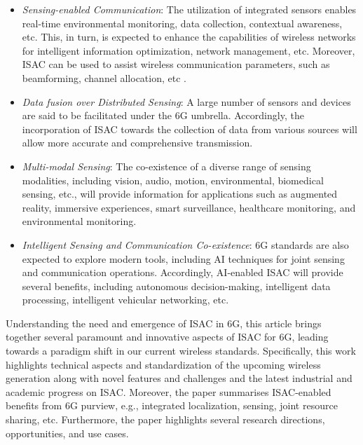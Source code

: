 \documentclass[journal, comsoc]{IEEEtran}
\begin{document}
\begin{itemize}

\item  \emph{Sensing-enabled Communication}: The utilization of integrated sensors enables real-time environmental monitoring, data collection, contextual awareness, etc. This, in turn, is expected to enhance the capabilities of wireless networks for intelligent information optimization, network management, etc. Moreover, ISAC can be used to assist wireless communication parameters, such as beamforming, channel allocation, etc \cite{l1}. 
\item  	\emph{Data fusion over Distributed Sensing}: A large number of sensors and devices are said to be facilitated under the 6G umbrella. Accordingly, the incorporation of ISAC towards the collection of data from various sources will allow more accurate and comprehensive transmission.
\item  	\emph{Multi-modal Sensing}: The co-existence of a diverse range of sensing modalities, including vision, audio, motion, environmental, biomedical sensing, etc., will provide information for applications such as augmented reality, immersive experiences, smart surveillance, healthcare monitoring, and environmental monitoring.
\item 	\emph{Intelligent Sensing and Communication Co-existence}: 6G standards are also expected to explore modern tools, including AI techniques for joint sensing and communication operations. Accordingly, AI-enabled ISAC will provide several benefits, including autonomous decision-making, intelligent data processing, intelligent vehicular networking, etc.
\end{itemize}


Understanding the need and emergence of ISAC in 6G, this article brings together several paramount and innovative aspects of ISAC for 6G, leading towards a paradigm shift in our current wireless standards. Specifically, this work highlights technical aspects and standardization of the upcoming wireless generation along with novel features and challenges and the latest industrial and academic progress on ISAC. Moreover, the paper summarises ISAC-enabled benefits from 6G purview, e.g., integrated localization, sensing, joint resource sharing, etc. Furthermore, the paper highlights several research directions,  opportunities, and use cases.      
\end{document}
